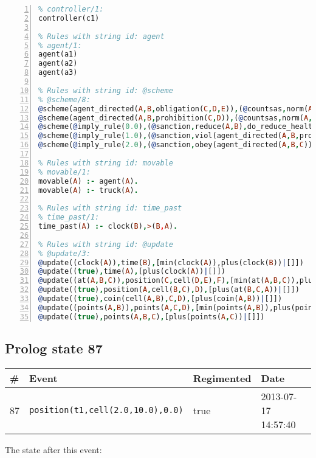 \documentclass[11pt]{article}\usepackage[utf8]{inputenc}\usepackage{geometry}
\begin{document}
\begin{lstlisting}[language=Prolog, numbers=left]
% Rules with string id: controller
% controller/1:
controller(c1)

% Rules with string id: agent
% agent/1:
agent(a1)
agent(a2)
agent(a3)

% Rules with string id: @scheme
% @scheme/8:
@scheme(agent_directed(A,B,obligation(C,D,E)),(@countsas,norm(A,B,F,obligation(C,D,E)),F),false,(listTrue(C)),(time_past(D)),false,[plus(viol(agent_directed(A,B,obligation(C,D,E))))|[]],[plus(obey(agent_directed(A,B,obligation(C,D,E))))|[]])
@scheme(agent_directed(A,B,prohibition(C,D)),(@countsas,norm(A,B,E,prohibition(C,D)),E),(listTrue(C)),false,(false),false,[plus(viol(agent_directed(A,B,prohibition(C,D))))|[]],[plus(obey(agent_directed(A,B,prohibition(C,D))))|[]])
@scheme(@imply_rule(0.0),(@sanction,reduce(A,B),do_reduce_health(A,B),notifyAgent(A,changed(status))),true,false,false,false,[min(reduce(A,B))|[]],[])
@scheme(@imply_rule(1.0),(@sanction,viol(agent_directed(A,B,prohibition(C,D))),do_sanction(D)),true,false,false,false,[min(viol(agent_directed(A,B,prohibition(C,D))))|[]],[])
@scheme(@imply_rule(2.0),(@sanction,obey(agent_directed(A,B,C))),true,false,false,false,[min(obey(agent_directed(A,B,C)))|[]],[])

% Rules with string id: movable
% movable/1:
movable(A) :- agent(A).
movable(A) :- truck(A).

% Rules with string id: time_past
% time_past/1:
time_past(A) :- clock(B),>(B,A).

% Rules with string id: @update
% @update/3:
@update((clock(A)),time(B),[min(clock(A)),plus(clock(B))|[]])
@update((true),time(A),[plus(clock(A))|[]])
@update((at(A,B,C)),position(C,cell(D,E),F),[min(at(A,B,C)),plus(at(D,E,C))|[]])
@update((true),position(A,cell(B,C),D),[plus(at(B,C,A))|[]])
@update((true),coin(cell(A,B),C,D),[plus(coin(A,B))|[]])
@update((points(A,B)),points(A,C,D),[min(points(A,B)),plus(points(A,D))|[]])
@update((true),points(A,B,C),[plus(points(A,C))|[]])

\end{lstlisting}
\clearpage 
\subsection{Prolog state 87}
\begin{table}[ht]
\centering 
\begin{tabular}{l l l l} 
\textbf{\#} & \textbf{Event} & \textbf{Regimented} & \textbf{Date} \\ [0.5ex] 
\hline
87&\texttt{position(t1,cell(2.0,10.0),0.0)}&true&2013-07-17 14:57:40\\ [1ex] \hline\end{tabular}
\end{table}
The state after this event:
\end{document}
